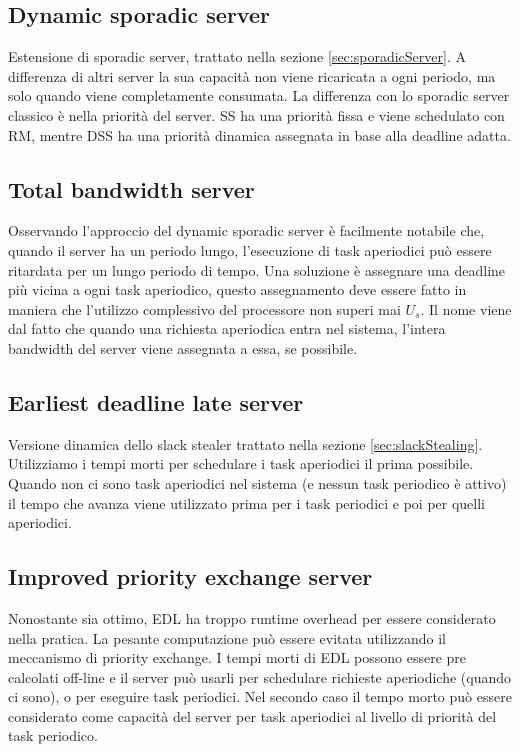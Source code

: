 \documentclass[12pt]{article}
\begin{document}
\subsection{Dynamic sporadic server}
\label{sec:dynamicSporadicServer}
Estensione di sporadic server, trattato nella sezione \ref{sec:sporadicServer}. A differenza di altri server la sua capacità non viene ricaricata a ogni periodo, ma solo quando viene completamente consumata.
La differenza con lo sporadic server classico è nella priorità del server. SS ha una priorità fissa e viene schedulato con RM, mentre DSS ha una priorità dinamica assegnata in base alla deadline adatta.
\subsection{Total bandwidth server}
\label{sec:totalBandwidthServer}
Osservando l'approccio del dynamic sporadic server è facilmente notabile che, quando il server ha un periodo lungo, l'esecuzione di task aperiodici può essere ritardata per un lungo periodo di tempo.
Una soluzione è assegnare una deadline più vicina a ogni task aperiodico, questo assegnamento deve essere fatto in maniera che l'utilizzo complessivo del processore non superi mai $U_s$.
Il nome viene dal fatto che quando una richiesta aperiodica entra nel sistema, l'intera bandwidth del server viene assegnata a essa, se possibile.
\subsection{Earliest deadline late server}
\label{sec:earliestDeadlineLateServer}
Versione dinamica dello slack stealer trattato nella sezione \ref{sec:slackStealing}.
Utilizziamo i tempi morti per schedulare i task aperiodici il prima possibile.
Quando non ci sono task aperiodici nel sistema (e nessun task periodico è attivo) il tempo che avanza viene utilizzato prima per i task periodici e poi per quelli aperiodici.
\subsection{Improved priority exchange server}
Nonostante sia ottimo, EDL ha troppo runtime overhead per essere considerato nella pratica.
La pesante computazione può essere evitata utilizzando il meccanismo di priority exchange.
I tempi morti di EDL possono essere pre calcolati off-line e il server può usarli per schedulare richieste aperiodiche (quando ci sono), o per eseguire task periodici.
Nel secondo caso il tempo morto può essere considerato come capacità del server per task aperiodici al livello di priorità del task periodico.
\end{document}
